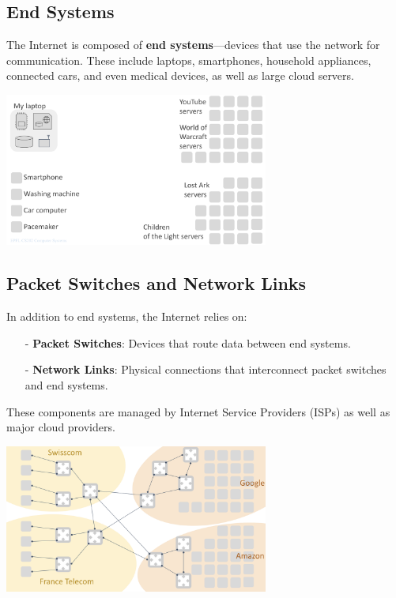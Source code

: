 \documentclass[../../compsys.tex]{subfiles}
\begin{document}
\subsection{End Systems}

The Internet is composed of \textbf{end systems}—devices that use the network for communication. These include laptops, smartphones, household appliances, connected cars, and even medical devices, as well as large cloud servers.

\begin{center}
  \includegraphics[width=0.65\textwidth]{chapters/L1/images/endsys.png}
\end{center}
\vfill
\newpage
\subsection{Packet Switches and Network Links}

In addition to end systems, the Internet relies on:
\begin{itemize}
  \item[-] \textbf{Packet Switches}: Devices that route data between end systems.
  \item[-] \textbf{Network Links}: Physical connections that interconnect packet switches and end systems.
\end{itemize}

These components are managed by Internet Service Providers (ISPs) as well as major cloud providers.

\begin{center}
  \includegraphics[width=0.65\textwidth]{chapters/L1/images/internet_schema.png}
\end{center}
\end{document}
